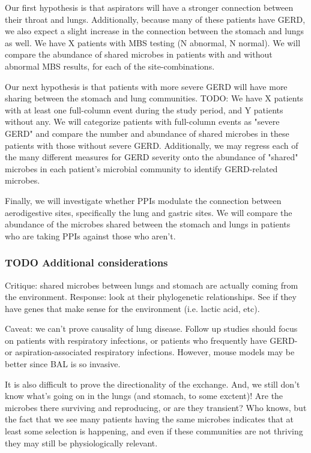 \documentclass[12pt]{article}
\begin{document}
Our first hypothesis is that aspirators will have a stronger connection between their throat and lungs. Additionally, because many of these patients have GERD, we also expect a slight increase in the connection between the stomach and lungs as well. We have X patients with MBS testing (N abnormal, N normal). We will compare the abundance of shared microbes in patients with and without abnormal MBS results, for each of the site-combinations. 

Our next hypothesis is that patients with more severe GERD will have more sharing between the stomach and lung communities. TODO: We have X patients with at least one full-column event during the study period, and Y patients without any. We will categorize patients with full-column events as "severe GERD" and compare the number and abundance of shared microbes in these patients with those without severe GERD. Additionally, we may regress each of the many different measures for GERD severity onto the abundance of "shared" microbes in each patient's microbial community to identify GERD-related microbes.

Finally, we will investigate whether PPIs modulate the connection between aerodigestive sites, specifically the lung and gastric sites. We will compare the abundance of the microbes shared between the stomach and lungs in patients who are taking PPIs against those who aren't. 

\subsubsection{TODO Additional considerations}
Critique: shared microbes between lungs and stomach are actually coming from the environment. Response: look at their phylogenetic relationships. See if they have genes that make sense for the environment (i.e. lactic acid, etc).

Caveat: we can't prove causality of lung disease. Follow up studies should focus on patients with respiratory infections, or patients who frequently have GERD- or aspiration-associated respiratory infections. However, mouse models may be better since BAL is so invasive.

It is also difficult to prove the directionality of the exchange. And, we still don't know what's going on in the lungs (and stomach, to some exctent)! Are the microbes there surviving and reproducing, or are they transient? Who knows, but the fact that we see many patients having the same microbes indicates that at least some selection is happening, and even if these communities are not thriving they may still be physiologically relevant.
\end{document}
